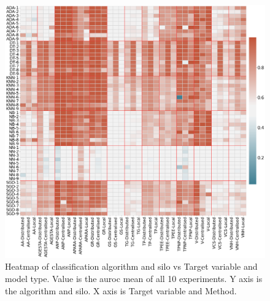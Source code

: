 



\begin{figure}[htbp]
\centering
\captionsetup{justification=centering}

\caption{Heatmap of classification algorithm and silo vs Target variable and model type. Value is the \ac{auroc} mean of all 10 experiments. Y axis is the algorithm and silo. X axis is Target variable and Method.}\label{fig:heatmap-cat} 
\includegraphics[scale=0.26]{figures/heatmap-class.png}
\end{figure}

